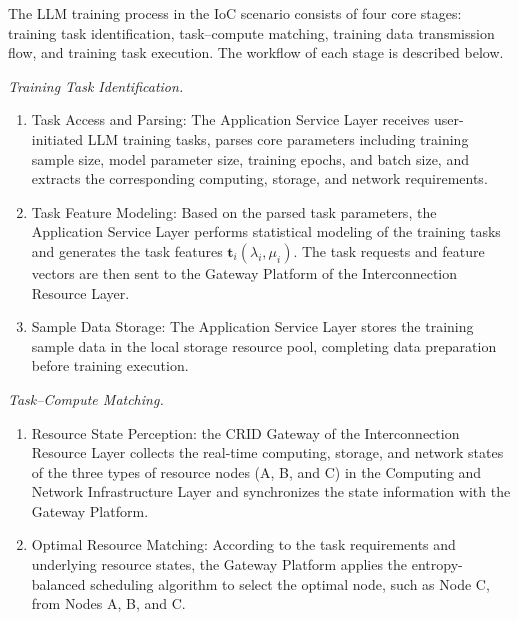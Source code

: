 \documentclass{ccjnl}
\begin{document}
The LLM training process in the IoC scenario consists of four core stages: training task identification, task--compute matching, training data transmission flow, and training task execution. The workflow of each stage is described below.

\par
{}
\noindent\textit{Training Task Identification.}\par

\begin{enumerate}[nosep,label=\arabic*)]
	\item Task Access and Parsing: The Application Service Layer receives user-initiated LLM training tasks, parses core parameters including training sample size, model parameter size, training epochs, and batch size, and extracts the corresponding computing, storage, and network requirements.
	
	\item Task Feature Modeling: Based on the parsed task parameters, the Application Service Layer performs statistical modeling of the training tasks and generates the task features $\mathbf{t}_i(\lambda_i,\mu_i)$. The task requests and feature vectors are then sent to the Gateway Platform of the Interconnection Resource Layer.
	
	\item Sample Data Storage: The Application Service Layer stores the training sample data in the local storage resource pool, completing data preparation before training execution.
\end{enumerate}

\par
{}
\noindent\textit{Task--Compute Matching.}\par

\begin{enumerate}[nosep,label=\arabic*)]
	\item Resource State Perception: the CRID Gateway of the Interconnection Resource Layer collects the real-time computing, storage, and network states of the three types of resource nodes (A, B, and C) in the Computing and Network Infrastructure Layer and synchronizes the state information with the Gateway Platform.
	
	\item Optimal Resource Matching: According to the task requirements and underlying resource states, the Gateway Platform applies the entropy-balanced scheduling algorithm to select the optimal node, such as Node C, from Nodes A, B, and C.
\end{enumerate}
\end{document}
